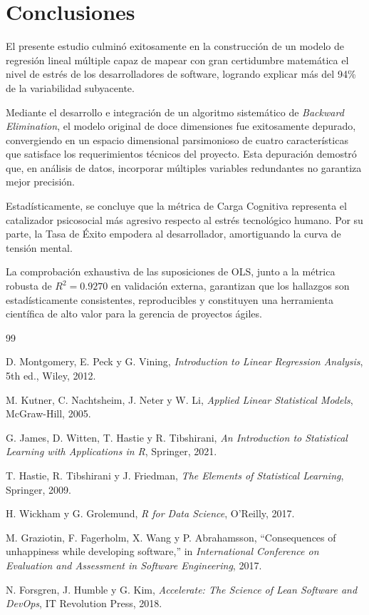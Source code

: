 \documentclass[conference]{IEEEtran}
\begin{document}
\section{Conclusiones}

El presente estudio culminó exitosamente en la construcción de un modelo de regresión lineal múltiple capaz de mapear con gran certidumbre matemática el nivel de estrés de los desarrolladores de software, logrando explicar más del 94\% de la variabilidad subyacente. 

Mediante el desarrollo e integración de un algoritmo sistemático de \textit{Backward Elimination}, el modelo original de doce dimensiones fue exitosamente depurado, convergiendo en un espacio dimensional parsimonioso de cuatro características que satisface los requerimientos técnicos del proyecto. Esta depuración demostró que, en análisis de datos, incorporar múltiples variables redundantes no garantiza mejor precisión.

Estadísticamente, se concluye que la métrica de Carga Cognitiva representa el catalizador psicosocial más agresivo respecto al estrés tecnológico humano. Por su parte, la Tasa de Éxito empodera al desarrollador, amortiguando la curva de tensión mental. 

La comprobación exhaustiva de las suposiciones de OLS, junto a la métrica robusta de $R^2 = 0.9270$ en validación externa, garantizan que los hallazgos son estadísticamente consistentes, reproducibles y constituyen una herramienta científica de alto valor para la gerencia de proyectos ágiles.

\begin{thebibliography}{99}

D. Montgomery, E. Peck y G. Vining,
\textit{Introduction to Linear Regression Analysis},
5th ed.,
Wiley,
2012.

M. Kutner, C. Nachtsheim, J. Neter y W. Li,
\textit{Applied Linear Statistical Models},
McGraw-Hill,
2005.

G. James, D. Witten, T. Hastie y R. Tibshirani,
\textit{An Introduction to Statistical Learning with Applications in R},
Springer,
2021.

T. Hastie, R. Tibshirani y J. Friedman,
\textit{The Elements of Statistical Learning},
Springer,
2009.

H. Wickham y G. Grolemund,
\textit{R for Data Science},
O'Reilly,
2017.

M. Graziotin, F. Fagerholm, X. Wang y P. Abrahamsson,
``Consequences of unhappiness while developing software,''
in \textit{International Conference on Evaluation and Assessment in Software Engineering},
2017.

N. Forsgren, J. Humble y G. Kim,
\textit{Accelerate: The Science of Lean Software and DevOps},
IT Revolution Press,
2018.

\end{thebibliography}
\end{document}
